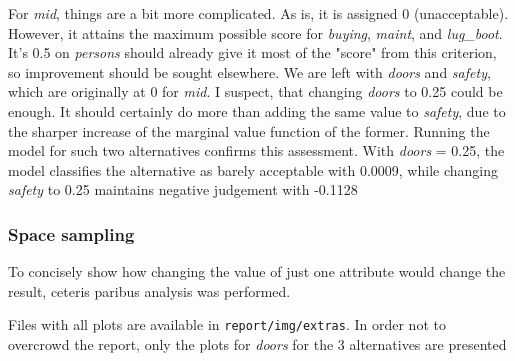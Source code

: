 \documentclass[../main.tex]{subfiles}
\begin{document}
For \emph{mid}, things are a bit more complicated. As is, it is assigned 0 (unacceptable).
However, it attains the maximum possible score for \emph{buying}, \emph{maint}, and \emph{lug\_boot}.
It's 0.5 on \emph{persons} should already give it most of the "score" from this criterion, so improvement
should be sought elsewhere. We are left with \emph{doors} and \emph{safety}, which are originally at 0 for \emph{mid}.
I suspect, that changing \emph{doors} to 0.25 could be enough.
It should certainly do more than adding the same value to \emph{safety}, due to the sharper increase of the
marginal value function of the former. Running the model for such two alternatives confirms this assessment.
With \emph{doors} = 0.25, the model classifies the alternative as barely acceptable with 0.0009,
while changing \emph{safety} to 0.25 maintains negative judgement with -0.1128

\subsubsection{Space sampling}
To concisely show how changing the value of just one attribute would change the result, ceteris paribus analysis
was performed.

Files with all plots are available in \verb`report/img/extras`. In order not to overcrowd the report,
only the plots for \emph{doors} for the 3 alternatives are presented
\end{document}
